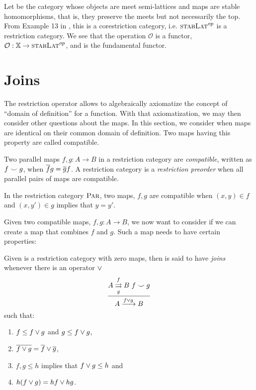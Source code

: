 Let \stabLat be the category whose objects are meet semi-lattices and maps are stable homomorphisms,
that is, they preserve the meets but not necessarily the top. From Example 13 in
\cite{cockett2002:restcategories1}, this is a corestriction category, i.e. $\textsc{stabLat}^{op}$ is a
restriction category. We see that the operation $\mathcal{O}$ is a functor, $\mathcal{O}: \mathbb{X} \to
\textsc{stabLat}^{op}$, and is the fundamental functor.

\section{Joins} %
\label{sub:joins_in_restriction_categories}

The restriction operator allows to algebraically axiomatize the concept of ``domain of definition''
for a function. With that axiomatization, we may then consider other questions about the maps. In
this section, we consider when maps are identical on their common domain of definition. Two maps
having this property are called compatible.

\begin{definition}\label{def:compatible_maps}
  Two parallel maps $f,g:A \to B$ in a restriction category are \emph{compatible}, written as $f
  \smile g$, when $\overline{f} g = \overline{g} f$.  A restriction category \X is a \emph{restriction
    preorder} when all parallel pairs of maps are compatible.
\end{definition}

\begin{example}\label{ex:compatibility_in_par}
In the restriction category $\textsc{Par}$, two maps, $f, g$ are compatible when
$(x,y) \in f$ and $(x,y')\in g$ implies that $y = y'$.
\end{example}

Given two compatible maps, $f,g:A\to B$, we now want to consider if we can create a map that
combines $f$ and $g$. Such a map needs to have certain properties:

\begin{definition}\label{def:joins}
  Given \R is a restriction category with zero maps, then \R is said to have
  \emph{joins}\cite{guox:thesis} whenever there is an operator $\vee$
  \[
    \infer{A\xrightarrow{f\join g} B}
      {A\overset{f}{\underset{g}{\rightrightarrows}}B\ f\compatible g}
  \]
  such that:
  \begin{enumerate}[{(}i{)}]
    \item $f \le f \vee g$ and $g \le f \vee g$,\label{defitem:join1}
    \item $\overline{f\vee g} = \overline{f}\vee \overline{g}$,\label{defitem:join2}
    \item $f,g \le h$ implies that $f\vee g \le h$ and\label{defitem:join3}
    \item $h(f\vee g) = h f \vee h g$.\label{defitem:join4}
  \end{enumerate}
\end{definition}

